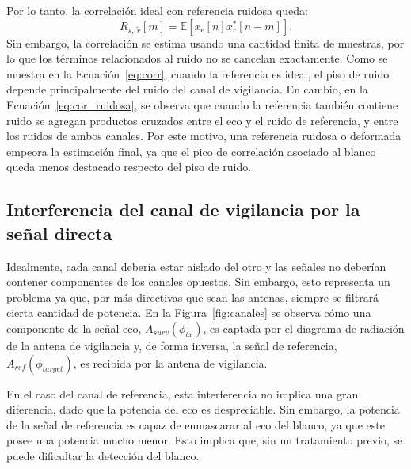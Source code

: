 	Por lo tanto, la correlación ideal con referencia ruidosa queda:
	\begin{equation}
		R_{s,\ \tilde{r}}[m]
		=
		\mathbb{E}\left[
		x_{\text{e}}[n]x_r^*[n-m]
		\right].
	\end{equation}
	Sin embargo, la correlación se estima usando una cantidad finita de muestras, por lo que los términos relacionados al ruido no se cancelan exactamente. Como se muestra en la Ecuación~\ref{eq:corr}, cuando la referencia es ideal, el piso de ruido depende principalmente del ruido del canal de vigilancia. En cambio, en la Ecuación~\ref{eq:cor_ruidosa}, se observa que cuando la referencia también contiene ruido se agregan productos cruzados entre el eco y el ruido de referencia, y entre los ruidos de ambos canales. Por este motivo, una referencia ruidosa o deformada empeora la estimación final, ya que el pico de correlación asociado al blanco queda menos destacado respecto del piso de ruido. 





\subsection{Interferencia del canal de vigilancia por la señal directa}

	


	Idealmente, cada canal debería estar aislado del otro y las señales no deberían contener componentes de los canales opuestos. Sin embargo, esto representa un problema ya que, por más directivas que sean las antenas, siempre se filtrará cierta cantidad de potencia.
	En la Figura~\ref{fig:canales} se observa cómo una componente de la señal eco, $A_{surv}(\phi_{tx})$, es captada por el diagrama de radiación de la antena de vigilancia y, de forma inversa, la señal de referencia, $A_{ref}(\phi_{target})$, es recibida por la antena de vigilancia.

	En el caso del canal de referencia, esta interferencia no implica una gran diferencia, dado que la potencia del eco es despreciable. Sin embargo, la potencia de la señal de referencia es capaz de enmascarar al eco del blanco, ya que este posee una potencia mucho menor. Esto implica que, sin un tratamiento previo, se puede dificultar la detección del blanco.


